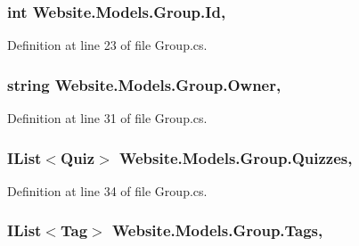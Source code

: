 \subsubsection[{Id}]{\setlength{\rightskip}{0pt plus 5cm}int Website.\+Models.\+Group.\+Id\hspace{0.3cm}{\ttfamily [get]}, {\ttfamily [set]}}\label{class_website_1_1_models_1_1_group_ad83a7c7820d6876c8c1c17e4c6fd4e4a}


Definition at line 23 of file Group.\+cs.

\hypertarget{class_website_1_1_models_1_1_group_afb79d6716f7be31ea11a24eba425aee4}{}
\subsubsection[{Owner}]{\setlength{\rightskip}{0pt plus 5cm}string Website.\+Models.\+Group.\+Owner\hspace{0.3cm}{\ttfamily [get]}, {\ttfamily [set]}}\label{class_website_1_1_models_1_1_group_afb79d6716f7be31ea11a24eba425aee4}


Definition at line 31 of file Group.\+cs.

\hypertarget{class_website_1_1_models_1_1_group_a22c383ca41607a2d85dc422d4da7c03c}{}
\subsubsection[{Quizzes}]{\setlength{\rightskip}{0pt plus 5cm}I\+List$<${\bf Quiz}$>$ Website.\+Models.\+Group.\+Quizzes\hspace{0.3cm}{\ttfamily [get]}, {\ttfamily [set]}}\label{class_website_1_1_models_1_1_group_a22c383ca41607a2d85dc422d4da7c03c}


Definition at line 34 of file Group.\+cs.

\hypertarget{class_website_1_1_models_1_1_group_a65c7d4d939e61ec00bdb5255e1d39f6a}{}
\subsubsection[{Tags}]{\setlength{\rightskip}{0pt plus 5cm}I\+List$<${\bf Tag}$>$ Website.\+Models.\+Group.\+Tags\hspace{0.3cm}{\ttfamily [get]}, {\ttfamily [set]}}\label{class_website_1_1_models_1_1_group_a65c7d4d939e61ec00bdb5255e1d39f6a}


